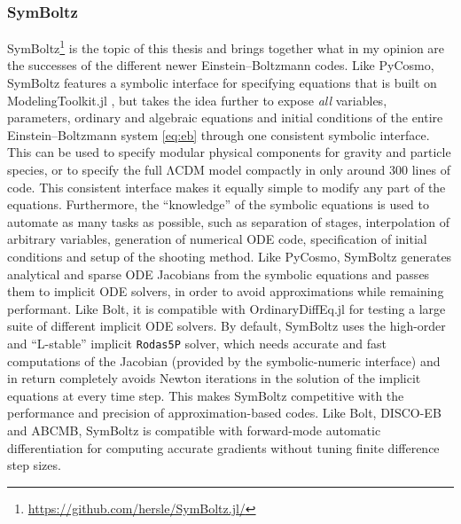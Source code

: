 \documentclass[USenglish, thumbmarks]{uiophdthesis} %
\newcommand\LCDM{\ensuremath{\mathrm{\Lambda CDM}}}
\newcommand\EB{Einstein--Boltzmann}
\begin{document}
\subsubsection{SymBoltz}
SymBoltz\footnote{\url{https://github.com/hersle/SymBoltz.jl/}} \cite{sletmoenSymBoltzjlSymbolicnumericApproximationfree2026}
is the topic of this thesis and
brings together what in my opinion are the successes of the different newer \EB{} codes.
Like PyCosmo, SymBoltz features a symbolic interface for specifying equations that is built on ModelingToolkit.jl \cite{maModelingToolkitComposableGraph2022},
but takes the idea further to expose \emph{all} variables, parameters, ordinary and algebraic equations and initial conditions
of the entire \EB{} system \eqref{eq:eb} through one consistent symbolic interface.
This can be used to specify modular physical components for gravity and particle species,
or to specify the full \LCDM{} model compactly in only around 300 lines of code.
This consistent interface makes it equally simple to modify any part of the equations.
Furthermore, the \enquote{knowledge} of the symbolic equations is used to automate as many tasks as possible,
such as separation of stages, interpolation of arbitrary variables, generation of numerical ODE code, specification of initial conditions and setup of the shooting method.
Like PyCosmo, SymBoltz generates analytical and sparse ODE Jacobians from the symbolic equations
and passes them to implicit ODE solvers,
in order to avoid approximations while remaining performant.
Like Bolt, it is compatible with OrdinaryDiffEq.jl for testing a large suite of different implicit ODE solvers.
By default, SymBoltz uses the high-order and \enquote{L-stable} implicit \texttt{Rodas5P} solver,
which needs accurate and fast computations of the Jacobian (provided by the symbolic-numeric interface)
and in return completely avoids Newton iterations in the solution of the implicit equations at every time step.
This makes SymBoltz competitive with the performance and precision of approximation-based codes.
Like Bolt, DISCO-EB and ABCMB, SymBoltz is compatible with forward-mode automatic differentiation
for computing accurate gradients without tuning finite difference step sizes.
\end{document}
